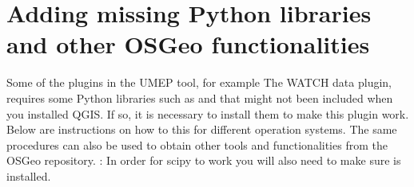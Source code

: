\documentclass[letterpaper,10pt,english]{sphinxmanual}
\begin{document}
\section{Adding missing Python libraries and other OSGeo functionalities}
\label{\detokenize{Getting_Started:adding-missing-python-libraries-and-other-osgeo-functionalities}}\label{\detokenize{Getting_Started:python-libraries}}
Some of the plugins in the UMEP tool, for example The WATCH data plugin,
requires some Python libraries such as  and  that
might not been included when you installed QGIS. If so, it is necessary
to install them to make this plugin work. Below are instructions on how
to this for different operation systems. The same procedures can also be
used to obtain other tools and functionalities from the OSGeo
repository. : In order for scipy to work you will also need to
make sure  is installed.
\end{document}
